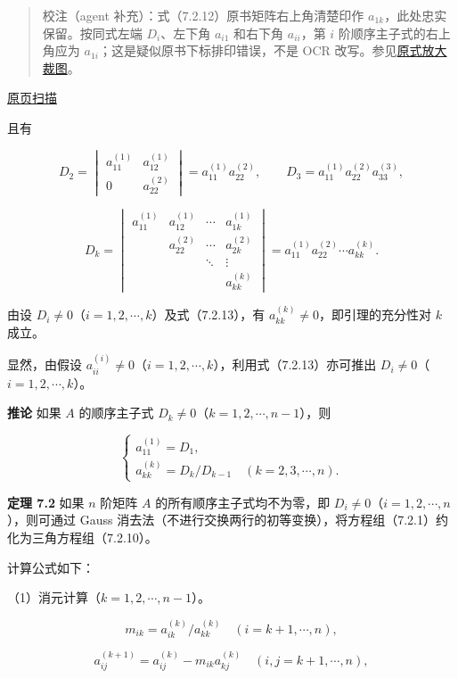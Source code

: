 \documentclass[
  10pt,
  fontset=fandol]{ctexart}
\begin{document}
\begin{quote}
校注（agent 补充）：式（7.2.12）原书矩阵右上角清楚印作 \(a_{1k}\)，此处忠实保留。按同式左端 \(D_i\)、左下角 \(a_{i1}\) 和右下角 \(a_{ii}\)，第 \(i\) 阶顺序主子式的右上角应为 \(a_{1i}\)；这是疑似原书下标排印错误，不是 OCR 改写。参见\href{../assets/ch07a/pdf-180-principal-minor-detail.png}{原式放大裁图}。
\end{quote}

\href{../../source-images/pdf-181.jpeg}{原页扫描}

且有

\[
D_2=\begin{vmatrix}a_{11}^{(1)}&a_{12}^{(1)}\\0&a_{22}^{(2)}\end{vmatrix}
=a_{11}^{(1)}a_{22}^{(2)},\qquad
D_3=a_{11}^{(1)}a_{22}^{(2)}a_{33}^{(3)},
\]

\[
D_k=\begin{vmatrix}
a_{11}^{(1)}&a_{12}^{(1)}&\cdots&a_{1k}^{(1)}\\
&a_{22}^{(2)}&\cdots&a_{2k}^{(2)}\\
&&\ddots&\vdots\\
&&&a_{kk}^{(k)}
\end{vmatrix}
=a_{11}^{(1)}a_{22}^{(2)}\cdots a_{kk}^{(k)}.
\tag{7.2.13}
\]

由设 \(D_i\ne0\)（\(i=1,2,\cdots,k\)）及式（7.2.13），有 \(a_{kk}^{(k)}\ne0\)，即引理的充分性对 \(k\) 成立。

显然，由假设 \(a_{ii}^{(i)}\ne0\)（\(i=1,2,\cdots,k\)），利用式（7.2.13）亦可推出 \(D_i\ne0\)（\(i=1,2,\cdots,k\)）。

\textbf{推论} 如果 \(A\) 的顺序主子式 \(D_k\ne0\)（\(k=1,2,\cdots,n-1\)），则

\[
\begin{cases}
a_{11}^{(1)}=D_1,\\
a_{kk}^{(k)}=D_k/D_{k-1}\quad(k=2,3,\cdots,n).
\end{cases}
\]

\textbf{定理 7.2} 如果 \(n\) 阶矩阵 \(A\) 的所有顺序主子式均不为零，即 \(D_i\ne0\)（\(i=1,2,\cdots,n\)），则可通过 Gauss 消去法（不进行交换两行的初等变换），将方程组（7.2.1）约化为三角方程组（7.2.10）。

计算公式如下：

（1）消元计算（\(k=1,2,\cdots,n-1\)）。

\[m_{ik}=a_{ik}^{(k)}/a_{kk}^{(k)}\quad(i=k+1,\cdots,n),\]

\[a_{ij}^{(k+1)}=a_{ij}^{(k)}-m_{ik}a_{kj}^{(k)}\quad(i,j=k+1,\cdots,n),\]
\end{document}
